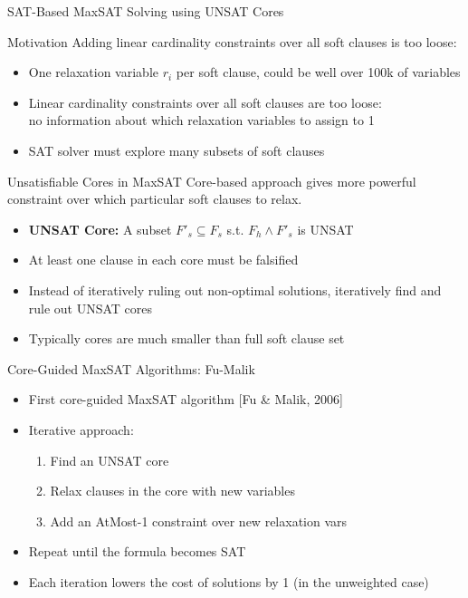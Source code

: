 \documentclass[t,english]{sdqbeamer}
\begin{document}
\begin{frame}{SAT-Based MaxSAT Solving using UNSAT Cores}
\vspace{-2em}
\begin{block}{Motivation}
Adding linear cardinality constraints over all soft clauses is too loose:
\begin{itemize}
	\item One relaxation variable $r_i$ per soft clause, could be well over 100k of variables
	\item Linear cardinality constraints over all soft clauses are too loose:\\
	no information about which relaxation variables to assign to 1
	\item SAT solver must explore many subsets of soft clauses
\end{itemize}
\end{block}
\begin{block}{Unsatisfiable Cores in MaxSAT}
Core-based approach gives more powerful constraint over which particular soft clauses to relax.
\begin{itemize}
	\item \textbf{UNSAT Core:} A subset $F'_s \subseteq F_s$ s.t. $F_h \wedge F'_s$ is UNSAT
	\item At least one clause in each core must be falsified
	\item Instead of iteratively ruling out non-optimal solutions, iteratively find and rule out UNSAT cores
	\item Typically cores are much smaller than full soft clause set
\end{itemize}
\end{block}
\end{frame}

\begin{frame}{Core-Guided MaxSAT Algorithms: Fu-Malik}
\begin{itemize}\itemsep1em
	\item First core-guided MaxSAT algorithm [Fu \& Malik, 2006]
	\item Iterative approach:
	\begin{enumerate}\itemsep1ex
		\item Find an UNSAT core
		\item Relax clauses in the core with new variables
		\item Add an AtMost-1 constraint over new relaxation vars
	\end{enumerate}
	\item Repeat until the formula becomes SAT
	\item Each iteration lowers the cost of solutions by 1 (in the unweighted case)
\end{itemize}
\end{frame}
\end{document}
